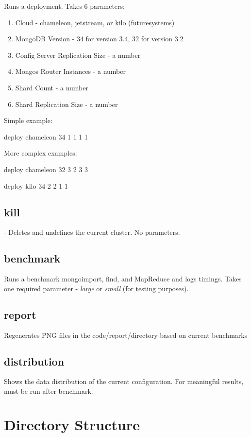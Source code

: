 \documentclass[9pt,twocolumn,twoside]{../../styles/osajnl}
\begin{document}
Runs a deployment.  Takes 6 parameters:


\begin{enumerate}

\item Cloud - chameleon, jetstream, or kilo (futuresystems)
\item MongoDB Version - 34 for version 3.4, 32 for version 3.2
\item Config Server Replication Size - a number
\item Mongos Router Instances - a number
\item Shard Count - a number
\item Shard Replication Size - a number


\end{enumerate}

Simple example:

deploy chameleon 34 1 1 1 1

More complex examples: 

deploy chameleon 32 3 2 3 3

deploy kilo 34 2 2 1 1


\subsection{kill} - Deletes and undefines the current cluster.  No parameters.

\subsection{benchmark}

Runs a benchmark mongoimport, find, and MapReduce and logs timings.
Takes one required parameter - \emph{large} or \emph{small} (for
testing purposes).

\subsection{report}

Regenerates PNG files in the code/report/directory based on current
benchmarks

\subsection{distribution}

Shows the data distribution of the current configuration. For
meaningful results, must be run after benchmark.

\section{Directory Structure}
\end{document}
